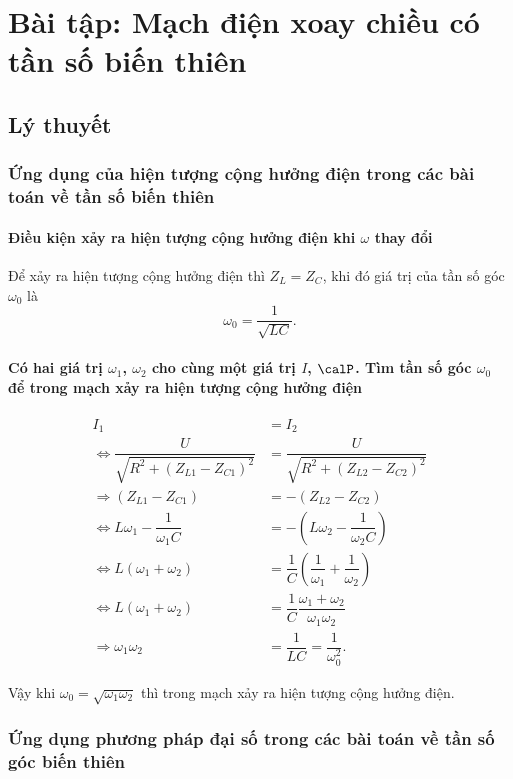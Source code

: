 
\chapter[Bài tập: Mạch điện xoay chiều có tần số biến thiên]{Bài tập: Mạch điện xoay chiều có tần số biến thiên}
\section{Lý thuyết}
\subsection{Ứng dụng của hiện tượng cộng hưởng điện trong các bài toán về tần số biến thiên}
\subsubsection{Điều kiện xảy ra hiện tượng cộng hưởng điện khi $\omega$ thay đổi}
Để xảy ra hiện tượng cộng hưởng điện thì $Z_L = Z_C$, khi đó giá trị của tần số góc $\omega_0$ là
\begin{equation*}
	\omega_0=\dfrac{1}{\sqrt{LC}}.
\end{equation*}
\subsubsection{Có hai giá trị $\omega_1$, $\omega_2$ cho cùng một giá trị $I$, $\calP$. Tìm tần số góc $\omega_0$ để trong mạch xảy ra hiện tượng cộng hưởng điện}
\begin{align*}
	I_1 &= I_2 \\
	\Leftrightarrow \dfrac{U}{\sqrt{R^2 + (Z_{L1}-Z_{C1})^2}}&=\dfrac{U}{\sqrt{R^2+(Z_{L2}-Z_{C2})^2}}\\
	\Rightarrow (Z_{L1}-Z_{C1})&=-(Z_{L2}-Z_{C2})\\
	\Leftrightarrow L\omega_1 - \dfrac{1}{\omega_1 C} &= -\left(L\omega_2-\dfrac{1}{\omega_2C}\right) \\
	\Leftrightarrow	L(\omega_1+\omega_2)&=\dfrac{1}{C}\left(\dfrac{1}{\omega_1}+\dfrac{1}{\omega_2}\right) \\
	\Leftrightarrow L(\omega_1+\omega_2)&=\dfrac{1}{C}\dfrac{\omega_1+\omega_2}{\omega_1\omega_2} \\
	\Rightarrow \omega_1\omega_2&=\dfrac{1}{LC}=\dfrac{1}{\omega_0^2}.
\end{align*}

Vậy khi $\omega_0=\sqrt{\omega_1\omega_2}$ thì trong mạch xảy ra hiện tượng cộng hưởng điện.
\subsection{Ứng dụng phương pháp đại số trong các bài toán về tần số góc biến thiên}

